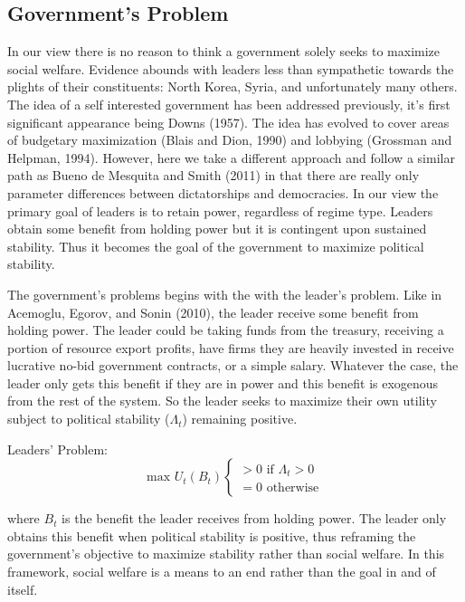 \documentclass[12pt]{article}
\begin{document}
\begin{spacing}{1.5}
\subsection{Government's Problem} 

In our view there is no reason to think a government solely seeks to maximize social welfare.  Evidence abounds with leaders less than sympathetic towards the plights of their constituents: North Korea, Syria, and unfortunately many others. The idea of a self interested government has been addressed previously, it's first significant appearance being Downs (1957). The idea has evolved to cover areas of budgetary maximization (Blais and Dion, 1990) and lobbying (Grossman and Helpman, 1994). However, here we take a different approach and follow a similar path as Bueno de Mesquita and Smith (2011) in that there are really only parameter differences between dictatorships and democracies. In our view the primary goal of leaders is to retain power, regardless of regime type. Leaders obtain some benefit from holding power but it is contingent upon sustained stability. Thus it becomes the goal of the government to maximize political stability. 

The government's problems begins with the with the leader's problem. Like in Acemoglu, Egorov, and Sonin (2010), the leader receive some benefit from holding power. The leader could be taking funds from the treasury, receiving a portion of resource export profits, have firms they are heavily invested in receive lucrative no-bid government contracts, or a simple salary. Whatever the case, the leader only gets this benefit if they are in power and this benefit is exogenous from the rest of the system. So the leader seeks to maximize their own utility subject to political stability ($\Lambda_t$) remaining positive. 


\vspace{.5 em}
\noindent Leaders' Problem:
\begin{equation}
	 \text{max } U_t(B_t) \begin{cases}
		>0 \text{ if } \Lambda_t > 0 \\
		= 0 \text{ otherwise} 	
	\end{cases}
\end{equation} 

\noindent where $B_t$ is the benefit the leader receives from holding power. The leader only obtains this benefit when political stability is positive, thus reframing the government's objective to maximize stability rather than social welfare. In this framework, social welfare is a means to an end rather than the goal in and of itself. 


\end{spacing}
\end{document}
